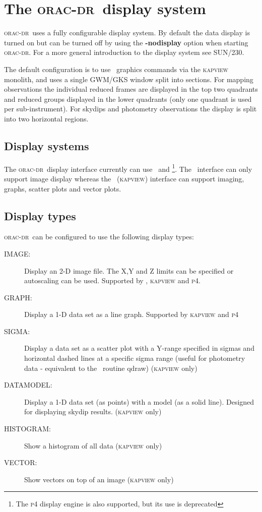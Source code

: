 \documentclass[twoside,11pt]{article}
\newcommand{\xref}[3]{#1}
\newcommand{\xlabel}[1]{}
\renewcommand{\_}{\texttt{\symbol{95}}}
\newcommand{\oracdr}{\xref{\textsc{orac-dr}}{sun230}{}}
\newcommand{\task}[1]{{\textsf{#1}}}
\newcommand{\Kappa}{\xref{{\sc{Kappa}}}{sun95}{}}
\newcommand{\SURF}{\xref{{\sc{Surf}}}{sun216}{}}
\newcommand{\gaia}{\xref{{\sc{Gaia}}}{sun214}{}}
\newcommand{\qdraw}{\xref{\task{qdraw}}{sun216}{QDRAW}}
\begin{document}
\section{The \oracdr\ display system\xlabel{the_orac_display_system}}

\oracdr\ uses a fully configurable display system. By default the data 
display is turned on but can be turned off by using the \textbf{-nodisplay}
option when starting \oracdr. For a more general introduction to the
display system see \xref{SUN/230}{sun230}{display_system}.

The default configuration is to use \Kappa\ graphics commands via the
\textsc{kapview} monolith, and uses a single
\xref{GWM}{sun219}{}/\xref{GKS}{sun83}{} window split into sections. For
mapping observations the individual reduced frames are displayed in the top
two quadrants and reduced groups displayed in the lower quadrants (only one
quadrant is used per sub-instrument). For skydips and photometry observations
the display is split into two horizontal regions.

\subsection{Display systems\xlabel{display_systems}}

The \oracdr\ display interface currently can use \Kappa\ and
\gaia\footnote{The \xref{\textsc{p4}}{sun27}{} display engine is also supported, but
its use is deprecated}. The \gaia\ interface can only support image display
whereas the \Kappa\ (\textsc{kapview}) interface can support imaging, graphs, scatter
plots and vector plots.

\subsection{Display types\xlabel{display_types}}

\oracdr\ can be configured to use the following display types:

\begin{description}
\item[IMAGE:] Display an 2-D image file. The X,Y and Z limits can be
specified or autoscaling can be used. Supported by \gaia, \textsc{kapview} and \textsc{p4}.
\item[GRAPH:] Display a 1-D data set as a line graph. Supported by
\textsc{kapview} and  \textsc{p4}
\item[SIGMA:] Display a data set as a scatter plot with a Y-range specified in 
sigmas and horizontal dashed lines at a specific sigma range 
(useful for photometry data - equivalent to the \SURF\ routine \qdraw) (\textsc{kapview} only) 
\item[DATAMODEL:] Display a 1-D data set (as points) with a model (as a solid
line). Designed for displaying skydip results. (\textsc{kapview} only)
\item[HISTOGRAM:] Show a histogram of all data (\textsc{kapview} only)
\item[VECTOR:] Show vectors on top of an image (\textsc{kapview} only)
\end{description}
\end{document}
